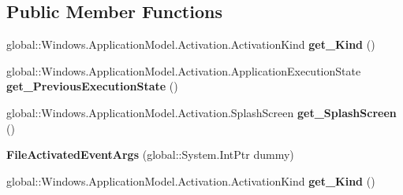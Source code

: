 \subsection*{Public Member Functions}
\begin{DoxyCompactItemize}
\item 
\mbox{\label{class_windows_1_1_application_model_1_1_activation_1_1_file_activated_event_args_a8ee51c8c3aa923f508add80971448095}} 
global\+::\+Windows.\+Application\+Model.\+Activation.\+Activation\+Kind {\bfseries get\+\_\+\+Kind} ()
\item 
\mbox{\label{class_windows_1_1_application_model_1_1_activation_1_1_file_activated_event_args_af7b1a8b374a110f715e4505b460818c6}} 
global\+::\+Windows.\+Application\+Model.\+Activation.\+Application\+Execution\+State {\bfseries get\+\_\+\+Previous\+Execution\+State} ()
\item 
\mbox{\label{class_windows_1_1_application_model_1_1_activation_1_1_file_activated_event_args_a8924bd743f51e1452ae2c4951c82d833}} 
global\+::\+Windows.\+Application\+Model.\+Activation.\+Splash\+Screen {\bfseries get\+\_\+\+Splash\+Screen} ()
\item 
\mbox{\label{class_windows_1_1_application_model_1_1_activation_1_1_file_activated_event_args_a9b823668ef64c779eaab2f5823ec10f4}} 
{\bfseries File\+Activated\+Event\+Args} (global\+::\+System.\+Int\+Ptr dummy)
\item 
\mbox{\label{class_windows_1_1_application_model_1_1_activation_1_1_file_activated_event_args_a8ee51c8c3aa923f508add80971448095}} 
global\+::\+Windows.\+Application\+Model.\+Activation.\+Activation\+Kind {\bfseries get\+\_\+\+Kind} ()
\item 
\mbox{\label{class_windows_1_1_application_model_1_1_activation_1_1_file_activated_event_args_af7b1a8b374a110f715e4505b460818c6}} 

\end{DoxyCompactItemize}

